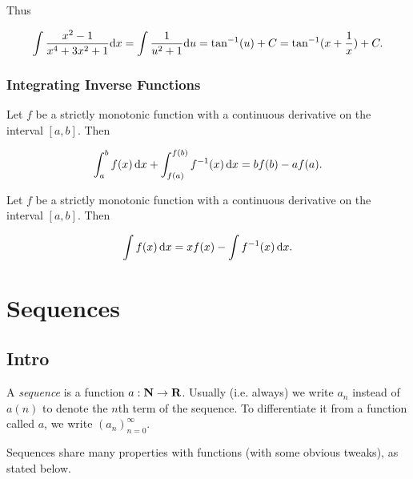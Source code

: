\documentclass{article}
\begin{document}
{\begin{eg}
      Thus 

      \[
        \int \frac{x^2-1}{x^4+3x^2+1} \mathrm{d} x = \int \frac{1}{u^2 + 1} \mathrm{d} u = \tan^{-1}(u) + C = \tan^{-1}(x + \frac{1}{x}) + C.
      \]
    \end{eg}
    
    \subsubsection*{Integrating Inverse Functions}
    \begin{thm} Let \(f\) be a strictly monotonic function with a continuous derivative on the interval \([a,b]\). Then 

      \[
        \int_{a}^{b}f(x) \, \mathrm{d} x + \int_{f(a)}^{f(b)}f^{-1}(x) \, \mathrm{d} x = bf(b) - af(a).
      \]
    \end{thm}

    \begin{thm} Let \(f\) be a strictly monotonic function with a continuous derivative on the interval \([a,b]\). Then 

      \[
        \int f(x) \, \mathrm{d} x = xf(x) - \int f^{-1}(x) \, \mathrm{d} x.
      \]
      
    \end{thm}

  }


  \section{Sequences}
  \subsection{Intro}

  \begin{defi}[Sequence]
    A \emph{sequence} is a function \(a: \mathbf{N} \to \mathbf{R}\). Usually (i.e. always) we write \(a_n\) instead of \(a(n)\) to denote the \(n\)th term of the sequence. To differentiate it from a function called \(a\), we write \((a_n)_{n=0}^{\infty}\). 
    \end{defi}
    Sequences share many properties with functions (with some obvious tweaks), as stated below.
\end{document}
